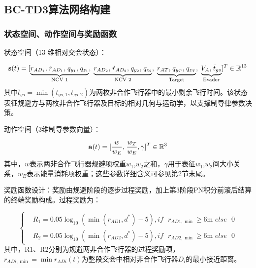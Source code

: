 \subsection{BC-TD3算法网络构建}
\subsubsection{状态空间、动作空间与奖励函数}
状态空间（13 维相对交会状态）：

\begin{equation}
\label{eq:72}
{\mathbf{s}}(t) = {[\underbrace {{r_{A{D_1}}},{\kern 1pt} {{\dot r}_{A{D_1}}},{\kern 1pt} {q_{{y_1}}},{\kern 1pt} {q_{{z_1}}}}_{{\text{NCV 1}}},\;\underbrace {{r_{A{D_2}}},{\kern 1pt} {{\dot r}_{A{D_2}}},{\kern 1pt} {q_{{y_2}}},{\kern 1pt} {q_{{z_2}}}}_{{\text{NCV 2}}},\;\underbrace {{r_{AT}},{\kern 1pt} {q_{{y_T}}},{\kern 1pt} {q_{{z_T}}}}_{{\text{Target}}},\;\underbrace {{V_A},{\kern 1pt} {{\bar t}_{go}}}_{{\text{Evader}}}]^T} \in {\mathbb{R}^{13}}
\end{equation}
其中${\bar t_{go}} = \min ({t_{go,1}},{t_{go,2}})$为两枚非合作飞行器中的最小剩余飞行时间。该状态表征规避方与两枚非合作飞行器及目标的相对几何与运动学，以支撑制导律参数决策。

动作空间（3维制导参数向量）：

\begin{equation}
\label{eq:73}
{\mathbf{a}}(t) = {[\frac{w}{{{w_E}}},{\kern 1pt} \frac{{{w_T}}}{{{w_E}}},\gamma ]^T} \in {\mathbb{R}^3}
\end{equation}
其中，$w$表示两非合作飞行器规避项权重${w_1}$,${w_2}$之和，$\gamma $用于表征${w_1}$,${w_2}$间大小关系，${w_E}$表示能量消耗项权重；这些参数详细含义可参见第2节末尾。

奖励函数设计：奖励由规避阶段的逐步过程奖励，加上第3阶段PN积分前滚后结算的终端奖励构成。过程奖励为：

\begin{equation}
\label{eq:74}
\left\{
\begin{aligned}
& {R_1} = 0.05{\log _{10}}(\min ({r_{AD1}},{d^*}) - 5),if{\text{ }}{r_{AD1,\min }} \geqslant 6{\text{m }}else{\text{ }}0 \\
& {R_2} = 0.05{\log _{10}}(\min ({r_{AD2}},{d^*}) - 5),if{\text{ }}{r_{AD2,\min }} \geqslant 6{\text{m }}else{\text{ }}0
\end{aligned}
\right.
\end{equation}
其中，R1、R2分别为规避两非合作飞行器的过程奖励项，${r_{ADi,\min }} = \min {r_{ADi}}(t)$为整段交会中相对非合作飞行器${D_i}$的最小接近距离。

